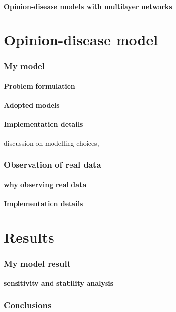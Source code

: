\documentclass[a4paper,11pt]{scrartcl}
\begin{document}
			\subsection{Opinion-disease models with multilayer networks} 
			
			
	\part{Opinion-disease model }
	
			\section{My model}
				\subsection{Problem formulation} %
				\subsection{Adopted models} %
				\subsection{Implementation details}
					discussion on modelling choices,
						
	\section{Observation of real data} %
		\subsection{why observing real data}
		\subsection{Implementation details}
		
		
	\part{Results}
		\section{My model result}
			\subsection{sensitivity and stability analysis} %
		\section{Conclusions} 
	
\end{document}
